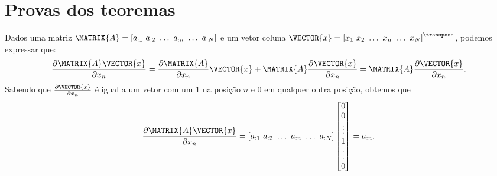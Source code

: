 \section{Provas dos teoremas}

\begin{myproofT}\label{proof:theo:derAx}
Dados
uma matriz $\MATRIX{A}=\left[a_{:1}~ a_{:2}~ \hdots~ a_{:n}~ \hdots~ a_{:N}\right]$ e 
um vetor coluna $\VECTOR{x}=\left[x_{1}~ x_{2}~ \hdots~ x_{n}~ \hdots~ x_{N}\right]^{\transpose}$, 
podemos expressar que:
\begin{equation}
\frac{\partial \MATRIX{A}\VECTOR{x}}{\partial x_n}=
\frac{\partial \MATRIX{A}}{\partial x_n}\VECTOR{x}+\MATRIX{A}\frac{\partial \VECTOR{x}}{\partial x_n}=
\MATRIX{A}\frac{\partial \VECTOR{x}}{\partial x_n}.
\end{equation}
Sabendo que $\frac{\partial \VECTOR{x}}{\partial x_n}$ é igual a um vetor 
com um $1$ na posição $n$ e $0$ em qualquer outra posição, obtemos que
\begin{equation}
\frac{\partial \MATRIX{A}\VECTOR{x}}{\partial x_n}=
\left[a_{:1}~ a_{:2}~ \hdots~ a_{:n}~ \hdots~ a_{:N}\right]\left[
\begin{matrix}
 0\\
 0\\
 \vdots\\
 1\\
 \vdots\\
 0
\end{matrix}
\right]=a_{:n}.
\end{equation}
\end{myproofT}

